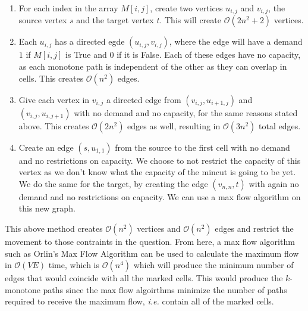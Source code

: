 \documentclass[addpoints]{exam}
\begin{document}
\begin{questions}
\begin{parts}
\begin{solution}
\begin{enumerate}
\item For each index in the array $M[i,j]$, create two vertices $u_{i,j}$ and $v_{i,j}$, the source vertex $s$ and the target vertex $t$. This will create $\mathcal{O}\left( 2n^{2}+2\right)$ vertices.
\item Each $u_{i,j}$ has a directed egde $\left( u_{i,j},v_{i,j} \right)$, where the edge will have a demand $1$ if $M[i,j]$ is {\sc True} and $0$ if it is {\sc False}. Each of these edges have no capacity, as each monotone path is independent of the other as they can overlap in cells. This creates $\mathcal{O}\left( n^{2} \right)$ edges.
\item Give each vertex in $v_{i,j}$ a directed edge from $\left( v_{i,j},u_{i+1,j} \right)$ and $\left( v_{i,j},u_{i,j+1} \right)$ with no demand and no capacity, for the same reasons stated above. This creates $\mathcal{O}\left( 2n^{2}\right)$ edges as well, resulting in $\mathcal{O}\left( 3n^{2}\right)$ total edges.
\item Create an edge $\left( s, u_{1,1}\right)$ from the source to the first cell with no demand and no restrictions on capacity. We choose to not restrict the capacity of this vertex as we don't know what the capacity of the mincut is going to be yet. We do the same for the target, by creating the edge $\left(v_{n,n},t \right)$ with again no demand and no restrictions on capacity. We can use a max flow algorithm on this new graph. 
\end{enumerate}



This above method creates $\mathcal{O}\left( n^{2}\right)$ vertices and $\mathcal{O}\left( n^{2}\right)$ edges and restrict the movement to those contraints in the question. From here, a max flow algorithm such as Orlin's Max Flow Algorithm can be used to calculate the maximum flow in $\mathcal{O}(VE)$ time, which is $\mathcal{O}\left( n^{4}\right)$ which will produce the minimum number of edges that would coincide with all the marked cells. This would produce the $k$-monotone paths since the max flow algoirthms minimize the number of paths required to receive the maximum flow, {\em i.e.} contain all of the marked cells.


\end{solution}
\end{parts}
\end{questions}
\end{document}
